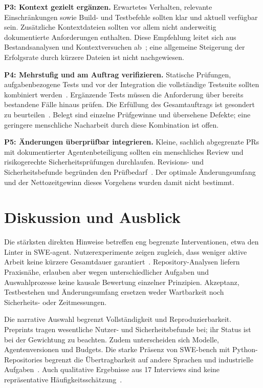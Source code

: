 \documentclass[conference]{IEEEtran}
\begin{document}
\textbf{P3: Kontext gezielt ergänzen.}
Erwartetes Verhalten, relevante Einschränkungen sowie Build- und Testbefehle sollten klar und aktuell verfügbar sein. Zusätzliche Kontextdateien sollten vor allem nicht anderweitig dokumentierte Anforderungen enthalten. Diese Empfehlung leitet sich aus Bestandsanalysen und Kontextversuchen ab~\cite{mohsenimofidi2026context,gloaguen2026agentsmd}; eine allgemeine Steigerung der Erfolgsrate durch kürzere Dateien ist nicht nachgewiesen.

\textbf{P4: Mehrstufig und am Auftrag verifizieren.}
Statische Prüfungen, aufgabenbezogene Tests und vor der Integration die vollständige Testsuite sollten kombiniert werden~\cite{yang2024sweagent,wang2026solvedissues}. Ergänzende Tests müssen die Anforderung über bereits bestandene Fälle hinaus prüfen. Die Erfüllung des Gesamtauftrags ist gesondert zu beurteilen~\cite{cemri2025mast}. Belegt sind einzelne Prüfgewinne und übersehene Defekte; eine geringere menschliche Nacharbeit durch diese Kombination ist offen.

\textbf{P5: Änderungen überprüfbar integrieren.}
Kleine, sachlich abgegrenzte PRs mit dokumentierter Agentenbeteiligung sollten ein menschliches Review und risikogerechte Sicherheitsprüfungen durchlaufen. Revisions- und Sicherheitsbefunde begründen den Prüfbedarf~\cite{watanabe2025agenticprs,sajadi2025patchsecurity}. Der optimale Änderungsumfang und der Nettozeitgewinn dieses Vorgehens wurden damit nicht bestimmt.

\section{Diskussion und Ausblick}
Die stärksten direkten Hinweise betreffen eng begrenzte Interventionen, etwa den Linter in SWE-agent. Nutzerexperimente zeigen zugleich, dass weniger aktive Arbeit keine kürzere Gesamtdauer garantiert~\cite{chen2025codewithme}. Repository-Analysen liefern Praxisnähe, erlauben aber wegen unterschiedlicher Aufgaben und Auswahlprozesse keine kausale Bewertung einzelner Prinzipien. Akzeptanz, Testbestehen und Änderungsumfang ersetzen weder Wartbarkeit noch Sicherheits- oder Zeitmessungen.

Die narrative Auswahl begrenzt Vollständigkeit und Reproduzierbarkeit. Preprints tragen wesentliche Nutzer- und Sicherheitsbefunde bei; ihr Status ist bei der Gewichtung zu beachten. Zudem unterscheiden sich Modelle, Agentenversionen und Budgets. Die starke Präsenz von SWE-bench mit Python-Repositories begrenzt die Übertragbarkeit auf andere Sprachen und industrielle Aufgaben~\cite{jimenez2024swebench,gloaguen2026agentsmd}. Auch qualitative Ergebnisse aus 17 Interviews sind keine repräsentative Häufigkeitsschätzung~\cite{dhanorkar2026oversight}.
\end{document}
